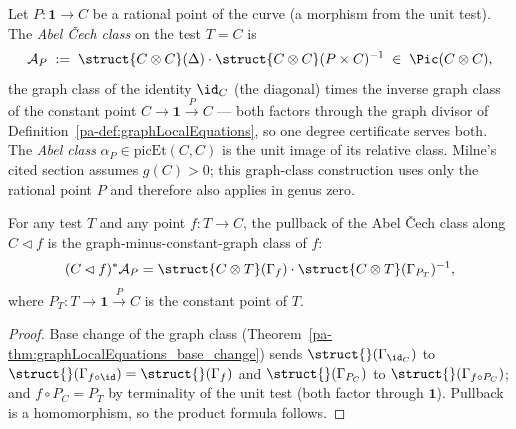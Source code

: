 \begin{definition}
  \label{pa-def:abelCechClass}
  \leanok


  Let \(P \colon \mathbf{1} \to C\) be a rational point of the curve (a morphism from the
  unit test). The \emph{Abel \v Cech class} on the test \(T = C\) is
  \[
    \mathcal A_P \;:=\; \struct{C \otimes C}(\Delta) \cdot \struct{C \otimes C}(P \times C)^{-1}
      \;\in\; \Pic(C \otimes C),
  \]
  the graph class of the identity \(\id_C\) (the diagonal) times the inverse graph class of
  the constant point \(C \to \mathbf 1 \xrightarrow{P} C\) — both factors through the graph
  divisor of Definition~\ref{pa-def:graphLocalEquations}, so one degree certificate serves
  both. The \emph{Abel class} \(\alpha_P \in \mathrm{picEt}(C, C)\) is the unit image of its
  relative class. Milne's cited section assumes \(g(C)>0\); this graph-class construction
  uses only the rational point \(P\) and therefore also applies in genus zero.
\end{definition}

\begin{theorem}
  \label{pa-thm:cechPicMap_abelCechClass}
  \leanok

  For any test \(T\) and any point \(f \colon T \to C\), the pullback of the Abel \v Cech
  class along \(C \lhd f\) is the graph-minus-constant-graph class of \(f\):
  \[
    (C \lhd f)^{*} \mathcal A_P
      = \struct{C \otimes T}(\Gamma_f)\cdot\struct{C \otimes T}(\Gamma_{P_T})^{-1},
  \]
  where \(P_T \colon T \to \mathbf 1 \xrightarrow{P} C\) is the constant point of \(T\).
\end{theorem}
\begin{proof}
  \leanok
  Base change of the graph class (Theorem~\ref{pa-thm:graphLocalEquations_base_change}) sends
  \(\struct{}(\Gamma_{\id_C})\) to \(\struct{}(\Gamma_{f \circ \id}) = \struct{}(\Gamma_f)\)
  and \(\struct{}(\Gamma_{P_C})\) to \(\struct{}(\Gamma_{f \circ P_C})\); and
  \(f \circ P_C = P_T\) by terminality of the unit test (both factor through
  \(\mathbf 1\)). Pullback is a homomorphism, so the product formula follows.
\end{proof}

